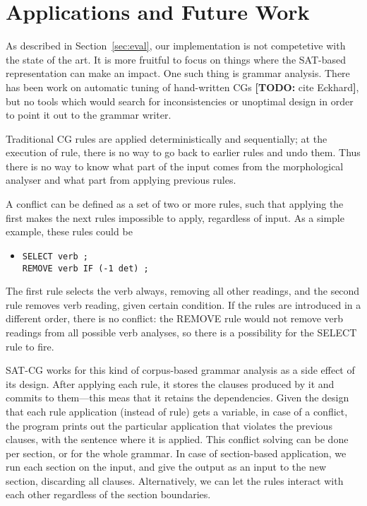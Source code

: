 \documentclass[11pt]{article}
\newcommand{\todo}[1]{{\color{cyan}\textbf{[TODO: }#1\textbf{]}}}
\begin{document}
\section{Applications and Future Work}
\label{sec:apps}
As described in Section~\ref{sec:eval}, our implementation is not
competetive with the state of the art. It is more fruitful to focus on
things where the SAT-based representation can make an impact.
One such thing is grammar analysis.
There has been work on automatic tuning of hand-written CGs \todo{cite
Eckhard}, but no tools which would search for inconsistencies or
unoptimal design in order to point it out to the grammar writer.

Traditional CG rules are applied deterministically and
sequentially; at the execution of rule, there is no way to
go back to earlier rules and undo them. Thus there is no way to know
what part of the input comes from the morphological analyser and what
part from applying previous rules.

A conflict can be defined as 
a set of two or more rules, such that applying the first makes the
next rules impossible to apply, regardless of input.
As a simple example, these rules could be

\begin{itemize}
\item [] \texttt{SELECT verb ;} \\
         \texttt{REMOVE verb IF (-1 det) ;}
\end{itemize}

The first rule selects the verb always, removing all other readings,
and the second rule removes verb reading, given certain condition.
If the rules are introduced in a different order, there is no
conflict: the REMOVE rule would not remove verb readings from all
possible verb analyses, so there is a possibility for the SELECT rule
to fire.

SAT-CG works for this kind of corpus-based grammar analysis as a side
effect of its design. After applying each rule, it stores the clauses
produced by it and commits to them---this meas that it retains the
dependencies.
Given the design that each rule application (instead of rule) gets a variable,
in case of a conflict, the program prints out the particular
application that violates the previous clauses, with the sentence
where it is applied. 
This conflict solving can be done per section, or for the whole grammar. 
In case of section-based application, we run each section on the
input, and give the output as an input to the new section, discarding
all clauses. Alternatively, we can let the rules interact with each
other regardless of the section boundaries.
\end{document}
